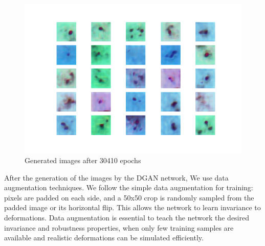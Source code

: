 \begin{figure}[h]
\caption{Generated images after 30410 epochs}
\label{fig:gen30410}
\begin{center}
\includegraphics[scale=0.45]{./images/generation/alta_mnist_30410.png} \end{center}
\end{figure}


After the generation of the images by the DGAN network, We use  data augmentation techniques. We follow the simple data augmentation for training: pixels are padded on each side,
and a 50x50 crop is randomly sampled from the padded
image or its horizontal flip.  This allows the network to learn invariance to deformations. Data augmentation is essential to teach the network the desired invariance and robustness properties, when only few training samples are available and realistic deformations can be simulated efficiently.


